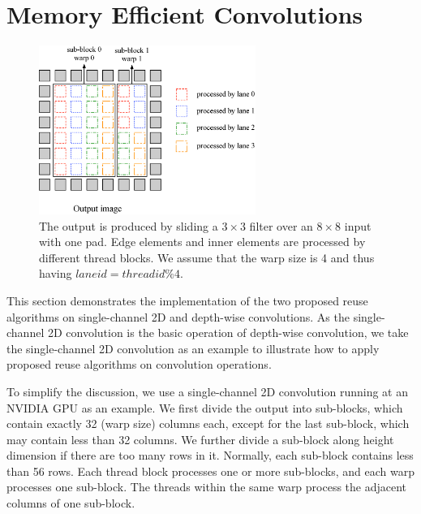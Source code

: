 \section{Memory Efficient Convolutions}
\begin{figure}
	\centering
	\includegraphics[width=0.9\columnwidth,height=5.5cm]{./figure/overalldesign.eps}
\caption{The output is produced by sliding a $3 \times 3$ filter over an $8 \times 8$ input with one pad. Edge elements and inner elements are processed by different thread blocks. We assume that the warp size is 4 and thus having $laneid=threadid\%4$.}
\label{fig:overalldesign}
\end{figure}


This section demonstrates the implementation of the two proposed reuse algorithms on single-channel 2D and depth-wise convolutions. {\color{red}As the single-channel 2D convolution is the basic operation of depth-wise convolution, we take the single-channel 2D convolution as an example to illustrate how to apply proposed reuse algorithms on convolution operations.}

To simplify the discussion, we use a single-channel 2D convolution running at an NVIDIA GPU as an example. We first divide the output
into sub-blocks, which contain exactly 32 (warp size) columns each, except for the last sub-block, which may contain less than 32 columns. {\color{red}We further divide a sub-block along height dimension if there are too many rows in it. Normally, each sub-block contains less than 56 rows.}
Each thread block processes one or more sub-blocks, and each warp processes one sub-block. The threads within the same warp process the adjacent columns of one sub-block.

